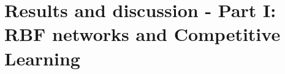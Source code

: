 \documentclass[a4paper]{article}
\begin{document}
\section{Results and discussion - Part I: RBF networks and Competitive Learning}

\end{document}
